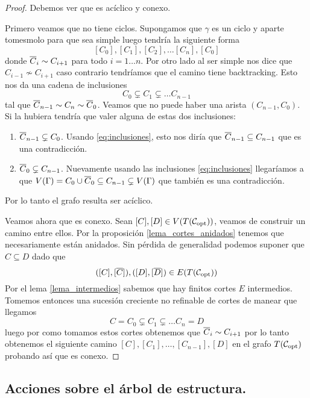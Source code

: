 \documentclass[tesis.tex]{subfiles}
\begin{document}
\begin{proof}
	Debemos ver que es acíclico y conexo.
	
	Primero veamos que no tiene ciclos.
	Supongamos que $\gamma$	es un ciclo y aparte tomesmolo para que sea simple luego tendría la siguiente forma
	\[
		[C_0], [C_1], [C_2], \dots [C_{n}], [C_0]
	\]
	donde $\overline C_{i} \sim C_{i+1}$ para todo $i=1 \dots n$.
	Por otro lado al ser simple nos dice que $C_{i-1} \nsim C_{i+1}$ caso contrario tendríamos que el camino tiene backtracking.
	Esto nos da una cadena de inclusiones
	\begin{equation}\label{eq:inclusiones}
			C_0 \subsetneq C_1 \subsetneq \dots C_{n-1}
	\end{equation}
	tal que $\overline C_{n-1} \sim C_n \sim \overline C_0$.
	Veamos que no puede haber una arista $(C_{n-1}, C_0)$.
	Si la hubiera tendría que valer alguna de estas dos inclusiones:
	\begin{enumerate}
		\item $\overline C_{n-1} \subsetneq C_0$.
		Usando \ref{eq:inclusiones}, esto nos diría que $\overline C_{n-1} \subseteq C_{n-1}$ que es una contradicción.
		\item $\overline C_{0} \subsetneq C_{n-1}$.
		Nuevamente usando las inclusiones \ref{eq:inclusiones} llegaríamos a que $V(\Gamma) = C_0 \cup \overline C_0 \subseteq C_{n-1} \subsetneq V(\Gamma)$ que también es una contradicción.
	\end{enumerate}
	Por lo tanto el grafo resulta ser acíclico.
	
	Veamos ahora que es conexo.
	Sean $[C], [D] \in V(T({\cal C}_{\text{opt}}))$, veamos de construir un camino entre ellos.
	Por la proposición \ref{lema_cortes_anidados} tenemos que necesariamente están anidados.
	Sin pérdida de generalidad podemos suponer que $C \subseteq D$ dado que
	\[
	([C], [\overline C]), ([D],[\overline D]) \in E(T({\cal C}_{\text{opt}}))
	\]
	Por el lema \ref{lema_intermedios} sabemos que hay finitos cortes $E$ intermedios.
	Tomemos entonces una sucesión creciente no refinable de cortes de manear que llegamos 
	\[
		C=C_0 \subsetneq C_1 \subsetneq \dots C_n = D
	\]
	luego por como tomamos estos cortes obtenemos que $\overline C_i \sim C_{i+1}$ por lo tanto obtenemos el siguiente camino $[C],[C_1], \dots, [C_{n-1}],[D]$ en el grafo $T({\cal C}_{\text{opt}})$ probando así que es conexo.	
\end{proof}

\subsection{Acciones sobre el árbol de estructura.}
\end{document}
